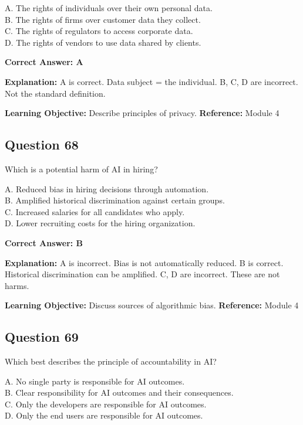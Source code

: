 \documentclass[11pt]{article}
\begin{document}
	A. The rights of individuals over their own personal data.\\
	B. The rights of firms over customer data they collect.\\
	C. The rights of regulators to access corporate data.\\
	D. The rights of vendors to use data shared by clients.
	
	\vspace{0.4em}
	\textbf{Correct Answer: A}
	
	\textbf{Explanation:}
	A is correct. Data subject = the individual.
	B, C, D are incorrect. Not the standard definition.
	
	\textbf{Learning Objective:} Describe principles of privacy.
	\textbf{Reference:} Module 4
	
	\subsection*{Question 68}
	Which is a potential harm of AI in hiring?
	
	A. Reduced bias in hiring decisions through automation.\\
	B. Amplified historical discrimination against certain groups.\\
	C. Increased salaries for all candidates who apply.\\
	D. Lower recruiting costs for the hiring organization.
	
	\vspace{0.4em}
	\textbf{Correct Answer: B}
	
	\textbf{Explanation:}
	A is incorrect. Bias is not automatically reduced.
	B is correct. Historical discrimination can be amplified.
	C, D are incorrect. These are not harms.
	
	\textbf{Learning Objective:} Discuss sources of algorithmic bias.
	\textbf{Reference:} Module 4
	
	\subsection*{Question 69}
	Which best describes the principle of accountability in AI?
	
	A. No single party is responsible for AI outcomes.\\
	B. Clear responsibility for AI outcomes and their consequences.\\
	C. Only the developers are responsible for AI outcomes.\\
	D. Only the end users are responsible for AI outcomes.
	
\end{document}
